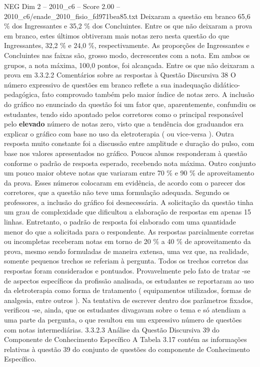 \begin{textsample}{NEG Dim 2 – 2010\_c6 – Score 2.00 – 2010\_c6/enade\_2010\_fisio\_fd971bea85.txt}
Deixaram a questão em branco 65,6 \% dos Ingressantes e 35,2 \% dos Concluintes.
Entre os que não deixaram a prova em branco, estes últimos obtiveram mais notas zero nesta questão do que Ingressantes, 32,2 \% e 24,0 \%, respectivamente.
As proporções de Ingressantes e Concluintes nas faixas são, grosso modo, decrescentes com a nota.
Em ambos os grupos, a nota máxima, 100,0 pontos, foi alcançada.
Entre os que não deixaram a prova em 3.3.2.2 Comentários sobre as respostas à Questão Discursiva 38 O número expressivo de questões em branco reflete a sua inadequação didático-pedagógica, fato comprovado também pelo maior índice de notas zero.
A inclusão do gráfico no enunciado da questão foi um fator que, aparentemente, confundiu os estudantes, tendo sido apontado pelos corretores como o principal responsável pelo \textbf{elevado} número de notas zero, visto que a tendência dos graduandos era explicar o gráfico com base no uso da eletroterapia ( ou vice-versa ).
Outra resposta muito constante foi a discussão entre amplitude e duração do pulso, com base nos valores apresentados no gráfico.
Poucos alunos responderam à questão conforme o padrão de resposta esperado, recebendo nota máxima.
Outro conjunto um pouco maior obteve notas que variaram entre 70 \% e 90 \% de aproveitamento da prova.
Esses números colocaram em evidência, de acordo com o parecer dos corretores, que a questão não teve uma formulação adequada.
Segundo os professores, a inclusão do gráfico foi desnecessária.
A solicitação da questão tinha um grau de complexidade que dificultou a elaboração de respostas em apenas 15 linhas.
Entretanto, o padrão de resposta foi elaborado com uma quantidade menor do que a solicitada para o respondente.
As respostas parcialmente corretas ou incompletas receberam notas em torno de 20 \% a 40 \% de aproveitamento da prova, mesmo sendo formuladas de maneira extensa, uma vez que, na realidade, somente pequenos trechos se referiam à pergunta.
Todos os trechos corretos das respostas foram considerados e pontuados.
Provavelmente pelo fato de tratar -se de aspectos específicos da profissão analisada, os estudantes se reportaram ao uso da eletroterapia como forma de tratamento ( equipamentos utilizados, formas de analgesia, entre outros ).
Na tentativa de escrever dentro dos parâmetros fixados, verificou -se, ainda, que os estudantes divagavam sobre o tema e só atendiam a uma parte da pergunta, o que resultou em um expressivo número de questões com notas intermediárias. 3.3.2.3 Análise da Questão Discursiva 39 do Componente de Conhecimento Específico A Tabela 3.17 contém as informações relativas à questão 39 do conjunto de questões do componente de Conhecimento Específico.

\end{textsample}
